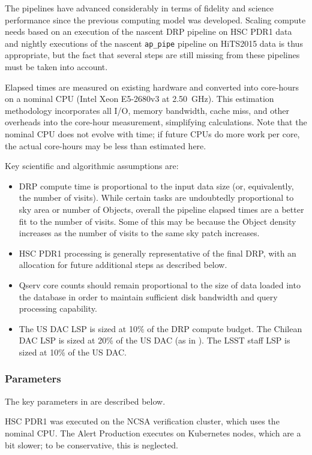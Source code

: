 The pipelines have advanced considerably in terms of fidelity and science performance since the previous computing model  was developed.
Scaling compute needs based on an execution of the nascent DRP pipeline on HSC PDR1 data and nightly executions of the nascent \texttt{ap\_pipe} pipeline on HiTS2015 data is thus appropriate, but the fact that several steps are still missing from these pipelines must be taken into account.

Elapsed times are measured on existing hardware and converted into core-hours on a nominal CPU (Intel Xeon E5-2680v3 at 2.50~GHz).
This estimation methodology incorporates all I/O, memory bandwidth, cache miss, and other overheads into the core-hour measurement, simplifying calculations.
Note that the nominal CPU does not evolve with time; if future CPUs do more work per core, the actual core-hours may be less than estimated here.

Key scientific and algorithmic assumptions are:
\begin{itemize}
\item DRP compute time is proportional to the input data size (or, equivalently, the number of visits).
While certain tasks are undoubtedly proportional to sky area or number of Objects, overall the pipeline elapsed times are a better fit to the number of visits.
Some of this may be because the Object density increases as the number of visits to the same sky patch increases.
\item HSC PDR1 processing is generally representative of the final DRP, with an allocation for future additional steps as described below.
\item Qserv core counts should remain proportional to the size of data loaded into the database in order to maintain sufficient disk bandwidth and query processing capability.
\item The US DAC LSP is sized at 10\% of the DRP compute budget.
The Chilean DAC LSP is sized at 20\% of the US DAC (as in ).
The LSST staff LSP is sized at 10\% of the US DAC.
\end{itemize}

\subsubsection{Parameters}
The key parameters in  are described below.

HSC PDR1 was executed on the NCSA verification cluster, which uses the nominal CPU.
The Alert Production executes on Kubernetes nodes, which are a bit slower; to be conservative, this is neglected.

